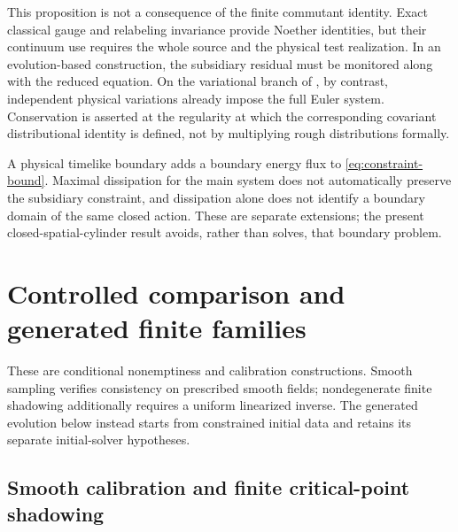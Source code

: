 \documentclass[11pt]{article}
\numberwithin{equation}{section}
\theoremstyle{definition}
\theoremstyle{remark}
\begin{document}
This proposition is not a consequence of the finite commutant identity. Exact classical gauge and relabeling invariance provide Noether identities, but their continuum use requires the whole source and the physical test realization. In an evolution-based construction, the subsidiary residual must be monitored along with the reduced equation. On the variational branch of , by contrast, independent physical variations already impose the full Euler system. Conservation is asserted at the regularity at which the corresponding covariant distributional identity is defined, not by multiplying rough distributions formally.

A physical timelike boundary adds a boundary energy flux to \eqref{eq:constraint-bound}. Maximal dissipation for the main system does not automatically preserve the subsidiary constraint, and dissipation alone does not identify a boundary domain of the same closed action. These are separate extensions; the present closed-spatial-cylinder result avoids, rather than solves, that boundary problem.

\section{Controlled comparison and generated finite families}
\label{app:comparison-families}

These are conditional nonemptiness and calibration constructions.
Smooth sampling verifies consistency on prescribed smooth fields;
nondegenerate finite shadowing additionally requires a uniform linearized
inverse. The generated evolution below instead starts from constrained
initial data and retains its separate initial-solver hypotheses.

\subsection{Smooth calibration and finite critical-point shadowing}
\end{document}

